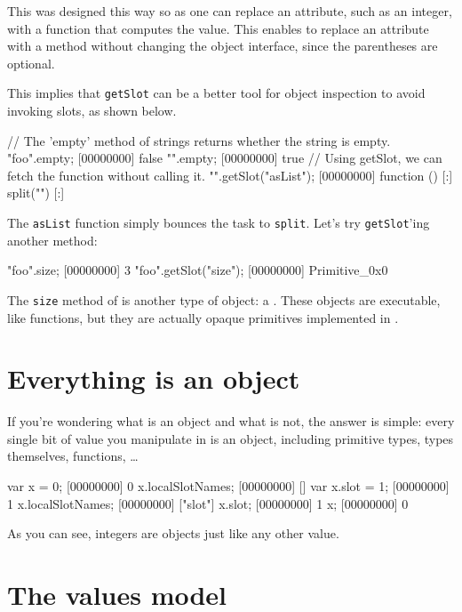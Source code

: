 This was designed this way so as one can replace an attribute, such as
an integer, with a function that computes the value. This enables to
replace an attribute with a method without changing the object
interface, since the parentheses are optional.

This implies that \lstinline|getSlot| can be a better tool for object
inspection to avoid invoking slots, as shown below.

\begin{urbiscript}
// The 'empty' method of strings returns whether the string is empty.
"foo".empty;
[00000000] false
"".empty;
[00000000] true
// Using getSlot, we can fetch the function without calling it.
"".getSlot("asList");
[00000000] function () {
[:]  split("")
[:]}
\end{urbiscript}

The \lstinline|asList| function simply bounces the task to
\lstinline|split|.  Let's try \lstinline{getSlot}'ing another method:

\begin{urbiscript}
"foo".size;
[00000000] 3
"foo".getSlot("size");
[00000000] Primitive_0x0
\end{urbiscript}

The \lstinline{size} method of  is another type of
object: a . These objects are executable, like
functions, but they are actually opaque primitives implemented in
\Cxx.

\section{Everything is an object}

If you're wondering what is an object and what is not, the answer is
simple: every single bit of value you manipulate in \us is an
object, including primitive types, types themselves, functions, \ldots

\begin{urbiscript}
var x = 0;
[00000000] 0
x.localSlotNames;
[00000000] []
var x.slot = 1;
[00000000] 1
x.localSlotNames;
[00000000] ["slot"]
x.slot;
[00000000] 1
x;
[00000000] 0
\end{urbiscript}

As you can see, integers are objects just like any other value.

\section{The \us values model}

